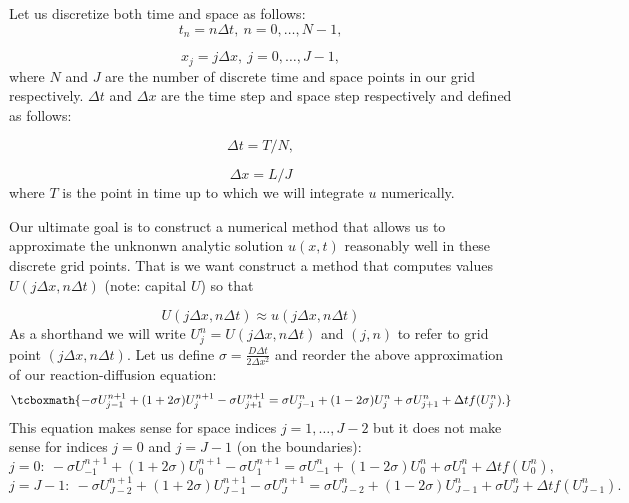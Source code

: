 \documentclass[../summary.tex]{subfiles}
\begin{document}
Let us discretize both time and space as follows:
\begin{equation}
    t_n = n \Delta t,~ n = 0, \ldots, N-1,
\end{equation}

\begin{equation}
    x_j = j \Delta x,~ j = 0, \ldots, J-1,
\end{equation}
where $N$ and $J$ are the number of discrete time and space points in our grid respectively.
$\Delta t$ and $\Delta x$ are the time step and space step respectively and defined as follows:

\begin{equation}
    \Delta t = T / N,
\end{equation}

\begin{equation}
    \Delta x = L / J
\end{equation}
where $T$ is the point in time up to which we will integrate $u$ numerically.

Our ultimate goal is to construct a numerical method that allows us to approximate the unknonwn analytic solution $u(x,t)$
reasonably well in these discrete grid points.
That is we want construct a method that computes values $U(j \Delta x, n \Delta t)$ (note: capital $U$) so that

\begin{equation}
    U(j \Delta x, n \Delta t) \approx u(j \Delta x, n \Delta t)
\end{equation}
As a shorthand we will write $U_j^n = U(j \Delta x, n \Delta t)$ and $(j,n)$ to refer to grid point $(j \Delta x, n \Delta t)$.
Let us define $\sigma = \frac{D \Delta t}{2 \Delta x^2}$ and reorder the above approximation of our reaction-diffusion equation:
\begin{equation}
    \tcboxmath{
    -\sigma U_{j-1}^{n+1} + (1+2\sigma) U_j^{n+1} -\sigma U_{j+1}^{n+1} = \sigma U_{j-1}^n + (1-2\sigma ) U_j^n + \sigma U_{j+1}^n + \Delta t f(U_j^n).
    }
    \label{eq:CN}
\end{equation}
This equation makes sense for space indices $j = 1,\ldots,J-2$ but it does not make sense for indices $j=0$ and $j=J-1$ (on the boundaries):
\begin{equation}
    j=0:~-\sigma U_{-1}^{n+1} + (1+2\sigma) U_0^{n+1} -\sigma U_{1}^{n+1} = \sigma U_{-1}^n + (1-2\sigma) U_0^n + \sigma U_{1}^n + \Delta t f(U_0^n),
\end{equation}
\begin{equation}
    j=J-1:~-\sigma U_{J-2}^{n+1} + (1+2\sigma) U_{J-1}^{n+1} -\sigma U_{J}^{n+1} = \sigma U_{J-2}^n + (1-2\sigma) U_{J-1}^n + \sigma U_{J}^n + \Delta t f(U_{J-1}^n).
\end{equation}
\end{document}
